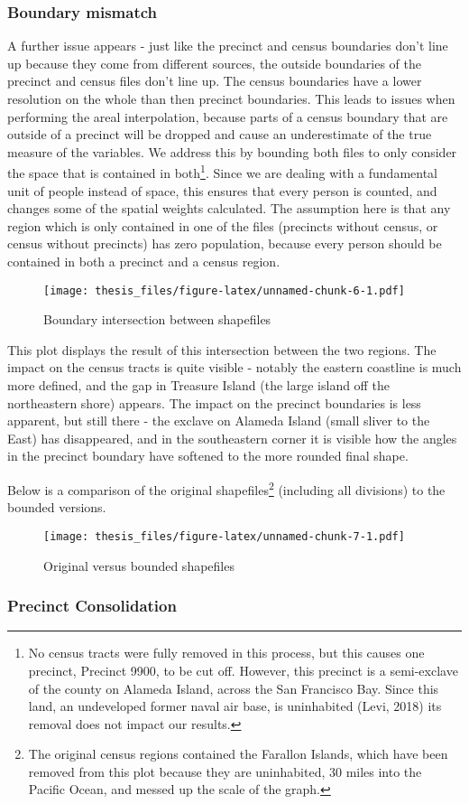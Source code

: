 \documentclass[12pt,twoside]{reedthesis}
\theoremstyle{definition}
\theoremstyle{definition}
\theoremstyle{definition}
\theoremstyle{remark}
\begin{document}
\hypertarget{boundary-mismatch}{%
\subsubsection{Boundary mismatch}\label{boundary-mismatch}}

A further issue appears - just like the precinct and census boundaries
don't line up because they come from different sources, the outside
boundaries of the precinct and census files don't line up. The census
boundaries have a lower resolution on the whole than then precinct
boundaries. This leads to issues when performing the areal
interpolation, because parts of a census boundary that are outside of a
precinct will be dropped and cause an underestimate of the true measure
of the variables. We address this by bounding both files to only
consider the space that is contained in both\footnote{No census tracts
  were fully removed in this process, but this causes one precinct,
  Precinct 9900, to be cut off. However, this precinct is a semi-exclave
  of the county on Alameda Island, across the San Francisco Bay. Since
  this land, an undeveloped former naval air base, is uninhabited (Levi,
  2018) its removal does not impact our results.}. Since we are dealing
with a fundamental unit of people instead of space, this ensures that
every person is counted, and changes some of the spatial weights
calculated. The assumption here is that any region which is only
contained in one of the files (precincts without census, or census
without precincts) has zero population, because every person should be
contained in both a precinct and a census region.
\begin{figure}
\centering
\texttt{[image: thesis\_files/figure-latex/unnamed-chunk-6-1.pdf]}
\caption{\label{fig:unnamed-chunk-6}Boundary intersection between
shapefiles}
\end{figure}
This plot displays the result of this intersection between the two
regions. The impact on the census tracts is quite visible - notably the
eastern coastline is much more defined, and the gap in Treasure Island
(the large island off the northeastern shore) appears. The impact on the
precinct boundaries is less apparent, but still there - the exclave on
Alameda Island (small sliver to the East) has disappeared, and in the
southeastern corner it is visible how the angles in the precinct
boundary have softened to the more rounded final shape.

Below is a comparison of the original shapefiles\footnote{The original
  census regions contained the Farallon Islands, which have been removed
  from this plot because they are uninhabited, 30 miles into the Pacific
  Ocean, and messed up the scale of the graph.} (including all
divisions) to the bounded versions.
\begin{figure}
\centering
\texttt{[image: thesis\_files/figure-latex/unnamed-chunk-7-1.pdf]}
\caption{\label{fig:unnamed-chunk-7}Original versus bounded shapefiles}
\end{figure}
\hypertarget{precinct-consolidation}{%
\subsubsection{Precinct Consolidation}\label{precinct-consolidation}}
\end{document}
